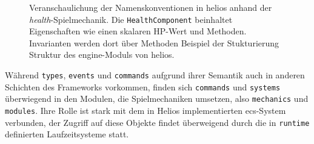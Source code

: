 \begin{figure}[htbp]
    \setlength{\DTbaselineskip}{18pt}
    \caption{Veranschaulichung der Namenskonventionen in helios anhand der \textit{health}-Spielmechanik.
    Die \texttt{HealthComponent} beinhaltet Eigenschaften wie einen skalaren HP-Wert und Methoden. Invarianten werden dort über Methoden  Beispiel der Stukturierung Struktur des engine-Moduls von helios.}
    \label{fig:engine_struktur}
\end{figure}


Während \texttt{types}, \texttt{events} und \texttt{commands} aufgrund ihrer Semantik auch in anderen Schichten des Frameworks vorkommen, finden sich \texttt{commands} und \texttt{systems} überwiegend in den Modulen, die Spielmechaniken umsetzen, also \texttt{mechanics} und \texttt{modules}.
Ihre Rolle ist stark mit dem in Helios implementierten ecs-System verbunden, der Zugriff auf diese Objekte findet überweigend durch die in \texttt{runtime} definierten Laufzeitsysteme statt.



